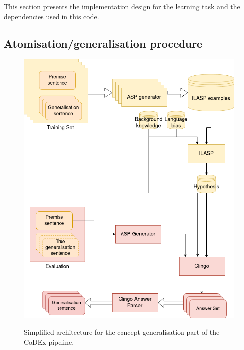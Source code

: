 This section presents the implementation design for the learning task and the dependencies used in this code.

\subsection{Atomisation/generalisation procedure}

\begin{figure}[h]
\caption{Simplified architecture for the concept generalisation part of the CoDEx pipeline.} 
\centering
\includegraphics[width=\textwidth]{solving-nlp-tasks-logically/simplified architecture diagram.png}
\label{generalisation-architecture-diagram}
\end{figure}



